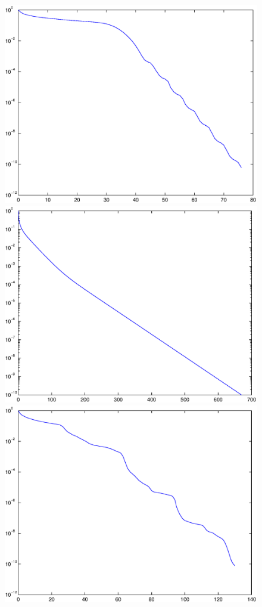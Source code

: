 \begin{figure}
\includegraphics[scale=0.35]{eps/mp3e50n20k1.eps}
\hfill
\includegraphics[scale=0.35]{eps/mp3e1n20k1.eps}
\\
\includegraphics[scale=0.35]{eps/mp3e50n20k16.eps}

\end{figure}
